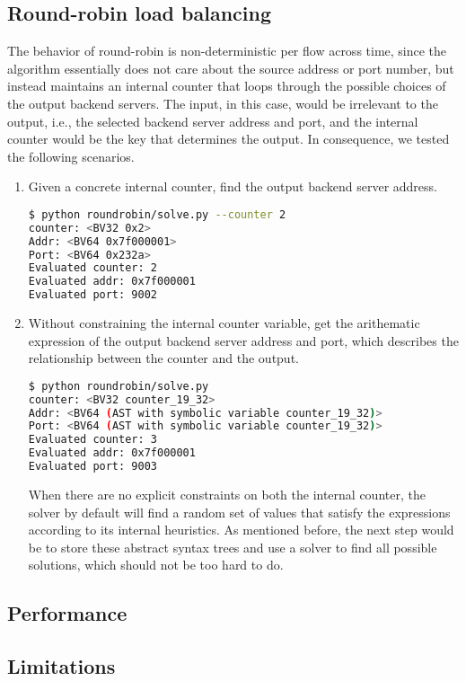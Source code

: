\subsection{Round-robin load balancing}

The behavior of round-robin is non-deterministic per flow across time, since the
algorithm essentially does not care about the source address or port number, but
instead maintains an internal counter that loops through the possible choices of
the output backend servers. The input, in this case, would be irrelevant to the
output, i.e., the selected backend server address and port, and the internal
counter would be the key that determines the output. In consequence, we tested
the following scenarios.

\begin{enumerate}
    \item Given a concrete internal counter, find the output backend server
        address.

\begin{lstlisting}[language=bash]
$ python roundrobin/solve.py --counter 2
counter: <BV32 0x2>
Addr: <BV64 0x7f000001>
Port: <BV64 0x232a>
Evaluated counter: 2
Evaluated addr: 0x7f000001
Evaluated port: 9002
\end{lstlisting}

    \item Without constraining the internal counter variable, get the
        arithematic expression of the output backend server address and port,
        which describes the relationship between the counter and the output.

\begin{lstlisting}[language=bash]
$ python roundrobin/solve.py
counter: <BV32 counter_19_32>
Addr: <BV64 (AST with symbolic variable counter_19_32)>
Port: <BV64 (AST with symbolic variable counter_19_32)>
Evaluated counter: 3
Evaluated addr: 0x7f000001
Evaluated port: 9003
\end{lstlisting}

        When there are no explicit constraints on both the internal counter,
        the solver by default will find a random set of values that satisfy the
        expressions according to its internal heuristics. As mentioned before,
        the next step would be to store these abstract syntax trees and use a
        solver to find all possible solutions, which should not be too hard to
        do.
\end{enumerate}

\subsection{Performance}

\subsection{Limitations}

